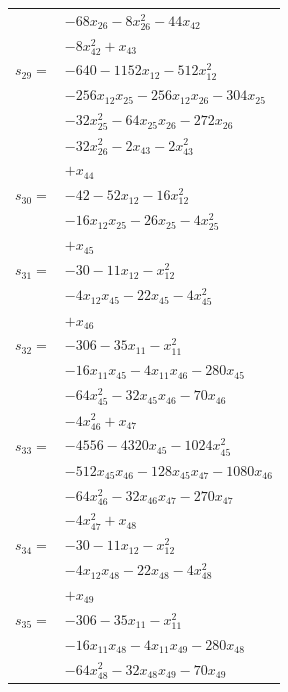 \begin{longtable}{@{}r@{\;}l@{}}
 & \(\displaystyle -68x_{26} -8x_{26}^{2} -44x_{42}\) \\
 & \(\displaystyle -8x_{42}^{2} +x_{43}\) \\[3pt]
\(s_{29}=\) & \(\displaystyle -640 -1152x_{12} -512x_{12}^{2}\) \\
 & \(\displaystyle -256x_{12}x_{25} -256x_{12}x_{26} -304x_{25}\) \\
 & \(\displaystyle -32x_{25}^{2} -64x_{25}x_{26} -272x_{26}\) \\
 & \(\displaystyle -32x_{26}^{2} -2x_{43} -2x_{43}^{2}\) \\
 & \(\displaystyle +x_{44}\) \\[3pt]
\(s_{30}=\) & \(\displaystyle -42 -52x_{12} -16x_{12}^{2}\) \\
 & \(\displaystyle -16x_{12}x_{25} -26x_{25} -4x_{25}^{2}\) \\
 & \(\displaystyle +x_{45}\) \\[3pt]
\(s_{31}=\) & \(\displaystyle -30 -11x_{12} -x_{12}^{2}\) \\
 & \(\displaystyle -4x_{12}x_{45} -22x_{45} -4x_{45}^{2}\) \\
 & \(\displaystyle +x_{46}\) \\[3pt]
\(s_{32}=\) & \(\displaystyle -306 -35x_{11} -x_{11}^{2}\) \\
 & \(\displaystyle -16x_{11}x_{45} -4x_{11}x_{46} -280x_{45}\) \\
 & \(\displaystyle -64x_{45}^{2} -32x_{45}x_{46} -70x_{46}\) \\
 & \(\displaystyle -4x_{46}^{2} +x_{47}\) \\[3pt]
\(s_{33}=\) & \(\displaystyle -4556 -4320x_{45} -1024x_{45}^{2}\) \\
 & \(\displaystyle -512x_{45}x_{46} -128x_{45}x_{47} -1080x_{46}\) \\
 & \(\displaystyle -64x_{46}^{2} -32x_{46}x_{47} -270x_{47}\) \\
 & \(\displaystyle -4x_{47}^{2} +x_{48}\) \\[3pt]
\(s_{34}=\) & \(\displaystyle -30 -11x_{12} -x_{12}^{2}\) \\
 & \(\displaystyle -4x_{12}x_{48} -22x_{48} -4x_{48}^{2}\) \\
 & \(\displaystyle +x_{49}\) \\[3pt]
\(s_{35}=\) & \(\displaystyle -306 -35x_{11} -x_{11}^{2}\) \\
 & \(\displaystyle -16x_{11}x_{48} -4x_{11}x_{49} -280x_{48}\) \\
 & \(\displaystyle -64x_{48}^{2} -32x_{48}x_{49} -70x_{49}\) \\

\end{longtable}
